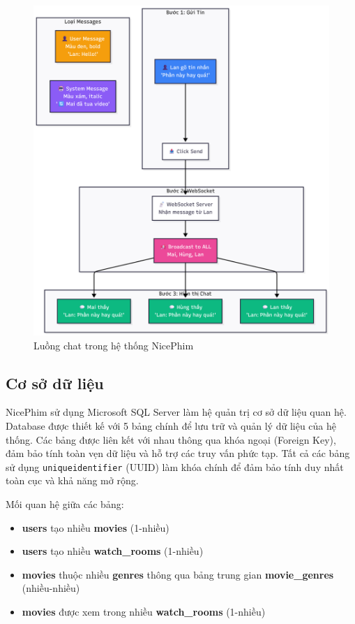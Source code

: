 \begin{figure}[H]
	\centering
	\includegraphics[width=1\textwidth]{image/mermaid/chat.png}
	\caption{Luồng chat trong hệ thống NicePhim}
	\label{fig:chat}
\end{figure}

\subsection{Cơ sở dữ liệu}

NicePhim sử dụng Microsoft SQL Server làm hệ quản trị cơ sở dữ liệu quan hệ. Database được thiết kế với 5 bảng chính để lưu trữ và quản lý dữ liệu của hệ thống. Các bảng được liên kết với nhau thông qua khóa ngoại (Foreign Key), đảm bảo tính toàn vẹn dữ liệu và hỗ trợ các truy vấn phức tạp. Tất cả các bảng sử dụng \texttt{uniqueidentifier} (UUID) làm khóa chính để đảm bảo tính duy nhất toàn cục và khả năng mở rộng.

Mối quan hệ giữa các bảng:
\begin{itemize}
	\item \textbf{users} tạo nhiều \textbf{movies} (1-nhiều)
	\item \textbf{users} tạo nhiều \textbf{watch\_rooms} (1-nhiều)
	\item \textbf{movies} thuộc nhiều \textbf{genres} thông qua bảng trung gian \textbf{movie\_genres} (nhiều-nhiều)
	\item \textbf{movies} được xem trong nhiều \textbf{watch\_rooms} (1-nhiều)
\end{itemize}

